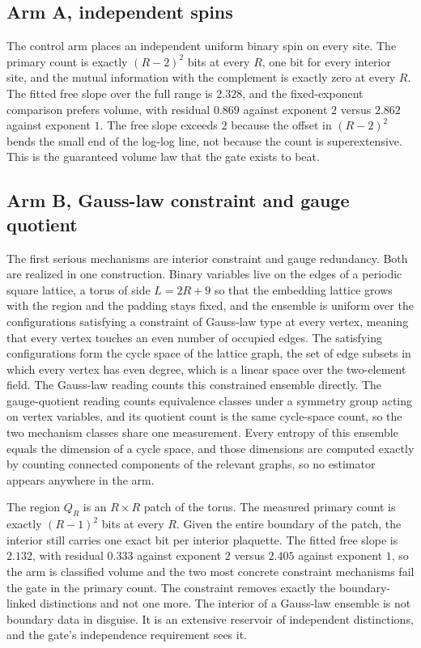 \documentclass[aps,pre,reprint,nofootinbib]{revtex4-2}
\begin{document}
\subsection{Arm A, independent spins}

The control arm places an independent uniform binary spin on every site.
The primary count is exactly $(R-2)^2$ bits at every $R$, one bit for
every interior site, and the mutual information with the complement is
exactly zero at every $R$.  The fitted free slope over the full range is
$2.328$, and the fixed-exponent comparison prefers volume, with residual
$0.869$ against exponent $2$ versus $2.862$ against exponent $1$.  The
free slope exceeds $2$ because the offset in $(R-2)^2$ bends the small
end of the log-log line, not because the count is superextensive.  This
is the guaranteed volume law that the gate exists to beat.

\subsection{Arm B, Gauss-law constraint and gauge quotient}

The first serious mechanisms are interior constraint and gauge
redundancy.  Both are realized in one construction.  Binary variables
live on the edges of a periodic square lattice, a torus of side
$L = 2R + 9$ so that the embedding lattice grows with the region and the
padding stays fixed, and the ensemble is uniform over the configurations
satisfying a constraint of Gauss-law type at every vertex, meaning that
every vertex touches an even number of occupied edges.  The satisfying
configurations form the cycle space of the lattice graph, the set of
edge subsets in which every vertex has even degree, which is a linear
space over the two-element field.  The Gauss-law reading counts this
constrained ensemble directly.  The gauge-quotient reading counts
equivalence classes under a symmetry group acting on vertex variables,
and its quotient count is the same cycle-space count, so the two
mechanism classes share one measurement.  Every entropy of this ensemble
equals the dimension of a cycle space, and those dimensions are computed
exactly by counting connected components of the relevant graphs, so no
estimator appears anywhere in the arm.

The region $Q_R$ is an $R \times R$ patch of the torus.  The measured
primary count is exactly $(R-1)^2$ bits at every $R$.  Given the entire
boundary of the patch, the interior still carries one exact bit per
interior plaquette.  The fitted free slope is $2.132$, with residual
$0.333$ against exponent $2$ versus $2.405$ against exponent $1$, so the
arm is classified volume and the two most concrete constraint mechanisms
fail the gate in the primary count.  The constraint removes exactly the
boundary-linked distinctions and not one more.  The interior of a
Gauss-law ensemble is not boundary data in disguise.  It is an extensive
reservoir of independent distinctions, and the gate's independence
requirement sees it.
\end{document}

